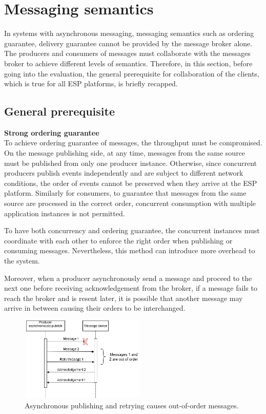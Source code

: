\section{Messaging semantics} \label{section:semantics}
In systems with asynchronous messaging, messaging semantics such as ordering guarantee, delivery guarantee cannot be provided by the message broker alone. The producers and consumers of messages must collaborate with the messages broker to achieve different levels of semantics. Therefore, in this section, before going into the evaluation, the general prerequisite for collaboration of the clients, which is true for all ESP platforms, is briefly recapped.
\subsection{General prerequisite}
\textbf{Strong ordering guarantee}\\
To achieve ordering guarantee of messages, the throughput must be compromised. On the message publishing side, at any time, messages from the same source must be published from only one producer instance. Otherwise, since concurrent producers publish events independently and are subject to different network conditions, the order of events cannot be preserved when they arrive at the ESP platform. Similarly for consumers, to guarantee that messages from the same source are processed in the correct order, concurrent consumption with multiple application instances is not permitted.

To have both concurrency and ordering guarantee, the concurrent instances must coordinate with each other to enforce the right order when publishing or consuming messages. Nevertheless, this method can introduce more overhead to the system.

Moreover, when a producer asynchronously send a message and proceed to the next one before receiving acknowledgement from the broker, if a message fails to reach the broker and is resent later, it is possible that another message may arrive in between causing their orders to be interchanged.
\begin{figure}[h]
	\centering
	\includegraphics[width=6cm,height=4cm]{images/order.png}
	\caption{Asynchronous publishing and retrying causes out-of-order messages.}
	\label{fig:outorderretry}
\end{figure}

